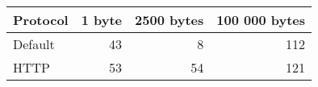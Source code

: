 \begin{tabular}{lrrr}
\hline
 Protocol   &   1 byte &   2500 bytes &   100 000 bytes \\
\hline
 Default    &       43 &            8 &             112 \\
 HTTP       &       53 &           54 &             121 \\
\hline
\end{tabular}
